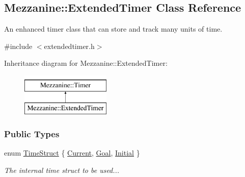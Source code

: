 \hypertarget{classMezzanine_1_1ExtendedTimer}{
\subsection{Mezzanine::ExtendedTimer Class Reference}
\label{classMezzanine_1_1ExtendedTimer}
}


An enhanced timer class that can store and track many units of time.  




{\ttfamily \#include $<$extendedtimer.h$>$}

Inheritance diagram for Mezzanine::ExtendedTimer:\begin{figure}[H]
\begin{center}
\leavevmode
\includegraphics[height=2.000000cm]{classMezzanine_1_1ExtendedTimer}
\end{center}
\end{figure}
\subsubsection*{Public Types}
\begin{DoxyCompactItemize}
\item 
enum \hyperlink{classMezzanine_1_1ExtendedTimer_a52119e2da54ea7ae5da0dc1f921a3b61}{TimeStruct} \{ \hyperlink{classMezzanine_1_1ExtendedTimer_a52119e2da54ea7ae5da0dc1f921a3b61ab66b80ae57d622d3555bdd2828b5dfff}{Current}, 
\hyperlink{classMezzanine_1_1ExtendedTimer_a52119e2da54ea7ae5da0dc1f921a3b61afd99677d1774c80bfaa92b6dba36c2ba}{Goal}, 
\hyperlink{classMezzanine_1_1ExtendedTimer_a52119e2da54ea7ae5da0dc1f921a3b61addcde9da9ed25254cd4919c1d6fb7172}{Initial}
 \}
\begin{DoxyCompactList}\small\item\em The internal time struct to be used... \item\end{DoxyCompactList}\end{DoxyCompactItemize}

